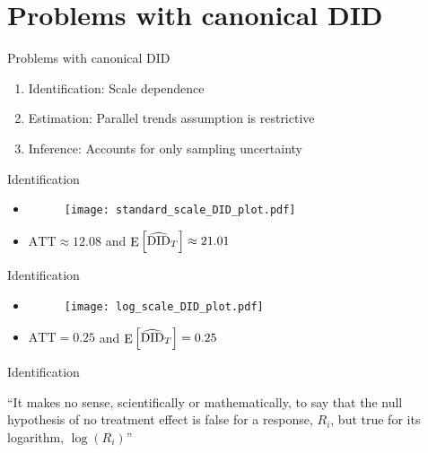 \documentclass[table, xcolor = {dvipsnames}, 9pt]{beamer}
\theoremstyle{plain}
\DeclareMathOperator{\E}{\rm{E}}
\begin{document}
\section{Problems with canonical DID}
\begin{frame}{Problems with canonical DID}
\vfill
\begin{enumerate} \vfill
\item Identification: Scale dependence \vfill
\item Estimation: Parallel trends assumption is restrictive \vfill
\item Inference: Accounts for only sampling uncertainty \vfill
\end{enumerate} \vfill
\end{frame}
\begin{frame}{Identification}
\begin{itemize}
\item[] 
\begin{figure}[H]
\texttt{[image: standard\_scale\_DID\_plot.pdf]}
\end{figure}
\item $\text{ATT} \approx 12.08$ and $\E\left[\widehat{\text{DID}}_{T}\right] \approx 21.01$ 
\end{itemize}
\end{frame}
\begin{frame}{Identification}
\begin{itemize}
\item[] 
\begin{figure}[H]
\texttt{[image: log\_scale\_DID\_plot.pdf]}
\end{figure}
\item $\text{ATT} = 0.25$ and $\E\left[\widehat{\text{DID}}_{T}\right] = 0.25$  
\end{itemize}
\end{frame}
\begin{frame}{Identification}
\begin{center}
``It makes no sense, scientifically or mathematically, to say that the null hypothesis of no treatment effect is false for a response, $R_i$, but true for its logarithm, $\log\left(R_i\right)$'' \citep[][p.~164]{rosenbaum2017}
\end{center}
\end{frame}
\end{document}
